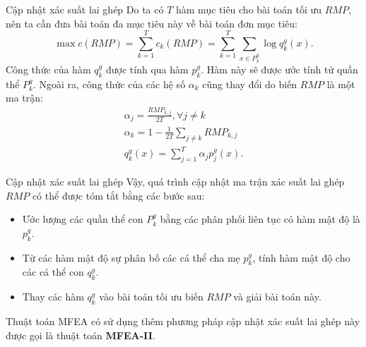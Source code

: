 \begin{frame}{Cập nhật xác suất lai ghép}
  Do ta có \( T \) hàm mục tiêu cho bài toán tối ưu \( RMP \), nên ta cần đưa
  bài toán đa mục tiêu này về bài toán đơn mục tiêu:
  \[
    \max c(RMP) = \sum_{k = 1}^{T} c_{k}(RMP) = \sum_{k = 1}^{T} \sum_{x \in
    P^{g}_{k}} \log q^{g}_{k}(x)
  .\] 
  Công thức của hàm \( q^{g}_{k} \) được tính qua hàm \( p^{g}_{k} \). Hàm này
  sẽ được ước tính tử quần thể \( P^{g}_{k} \). Ngoài ra, công thức của các hệ
  số \( \alpha_{k} \) cũng thay đổi do biến \( RMP \) là một ma trận:
  \begin{gather*}
    \alpha_{j} = \frac{RMP_{k,j}}{2T}, \forall  j \neq k\\
    \alpha_{k} = 1 - \frac{1}{2T}\sum_{j \neq  k} RMP_{k, j}\\
    q^{g}_{k}(x) = \sum_{j = 1}^{T} \alpha_{j}p^{g}_{j}(x)
  .\end{gather*}
\end{frame}

\begin{frame}{Cập nhật xác suất lai ghép}
  Vậy, quá trình cập nhật ma trận xác suất lai ghép \( RMP \) có thể được tóm
  tắt bằng các bước sau:
  \begin{itemize}
  \item Ước lượng các quần thể con \( P^{g}_{k} \) bằng các phân phối liên tục có
    hàm mật độ là \( p^{g}_{k} \).
  \item Từ các hàm mật độ sự phân bố  các cá thể cha mẹ \( p^{g}_{k} \), tính
    hàm mật độ cho các cá thể con \( q^{g}_{k} \).
  \item Thay các hàm \( q^{g}_{k} \) vào bài toán tối ưu biến \( RMP \) và giải
    bài toán này.
  \end{itemize}

  Thuật toán MFEA có sử dụng thêm phương pháp cập nhật xác suất lai ghép này
  được gọi là thuật toán \textbf{MFEA-II}.
\end{frame}


